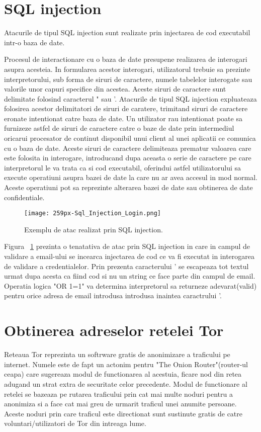 \section{SQL injection}

Atacurile de tipul SQL injection sunt realizate prin injectarea de cod executabil intr-o baza de date.

Procesul de interactionare cu o baza de date presupene realizarea de interogari asupra acesteia. In formularea acestor interogari, utilizatorul trebuie sa prezinte interpretorului, sub forma de siruri de caractere, numele tabelelor interogate sau valorile unor capuri specifice din acestea. Aceste siruri de caractere sunt delimitate folosind caracterul " sau '. Atacurile de tipul SQL injection expluateaza folosirea acestor delimitatori de siruri de caratere, trimitand siruri de caractere eronate intentionat catre baza de date. Un utilizator rau intentionat poate sa furnizeze astfel de siruri de caractere catre o baze de date prin intermediul oricarui procesator de continut disponibil unui client al unei aplicatii ce comunica cu o baza de date. Aceste siruri de caractere delimiteaza prematur valoarea care este folosita in interogare, introducand dupa aceasta o serie de caractere pe care interpretorul le va trata ca si cod executabil, oferindui astfel utilizatorului sa execute operatiuni asupra bazei de date la care nu ar avea accesul in mod normal. Aceste operatiuni pot sa reprezinte alterarea bazei de date sau obtinerea de date confidentiale. \\



\begin{figure}[h]
	\centering
	\texttt{[image: 259px-Sql\_Injection\_Login.png]}
	\caption{Exemplu de atac realizat prin SQL injection.}
	\label{fig:sqli-example}
\end{figure}

Figura ~\ref{fig:sqli-example} prezinta o tenatativa de atac prin SQL injection in care in campul de validare a email-ului se incearca injectarea de cod ce va fi executat in interogarea de validare a credentialelor. Prin prezenta caracterului ' se escapeaza tot textul urmat dupa acesta ca fiind cod si nu un string ce face parte din campul de email. Operatia logica "OR 1=1" va determina interpretorul sa returneze adevarat(valid) pentru orice adresa de email introdusa introdusa inaintea caractrului '. \\


\section{Obtinerea adreselor retelei Tor}
Reteaua Tor reprezinta un softrware gratis de anonimizare a traficului pe internet. Numele este de fapt un actonim pentru "The Onion Router"(router-ul ceapa) care sugereaza modul de functionarea al acestuia, ficare nod din retea adugand un strat extra de securitate celor precedente. Modul de functionare al retelei se bazeaza pe rutarea traficului prin cat mai multe noduri pentru a anonimiza si a face cat mai greu de urmarit traficul unei anumite persoane. Aceste noduri prin care traficul este directionat sunt sustinute gratis de catre voluntari/utilizatori de Tor din intreaga lume.

